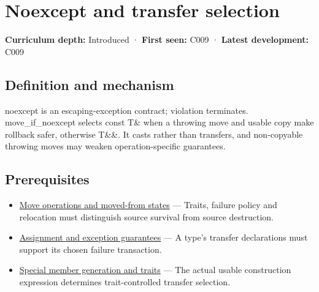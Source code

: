 \hypertarget{appendix-c746afaa47d1}{}\label{referencestart:appendix-c746afaa47d1}
\section{Noexcept and transfer selection}\label{appendix-c746afaa47d1-noexcept-and-transfer-selection}

\hypertarget{appendix-c746afaa47d1-noexcept-and-transfer-selection}{}

\textbf{Curriculum depth:} Introduced · \textbf{First seen:} C009 · \textbf{Latest development:} C009

\begin{allmightroledefinition}

\subsection{Definition and mechanism}\label{appendix-c746afaa47d1-definition-and-mechanism}

\hypertarget{appendix-c746afaa47d1-definition-and-mechanism}{}

noexcept is an escaping-exception contract; violation terminates. move\_if\_noexcept selects const T\& when a throwing move and usable copy make rollback safer, otherwise T\&\&. It casts rather than transfers, and non-copyable throwing moves may weaken operation-specific guarantees.

\end{allmightroledefinition}

\subsection{Prerequisites}\label{appendix-c746afaa47d1-prerequisites}

\hypertarget{appendix-c746afaa47d1-prerequisites}{}

\begin{itemize}
\tightlist
\item
  \hyperref[appendix-5636651017c2]{Move operations and moved-from states} --- Traits, failure policy and relocation must distinguish source survival from source destruction.
\item
  \hyperref[appendix-bea6beb5350f]{Assignment and exception guarantees} --- A type's transfer declarations must support its chosen failure transaction.
\item
  \hyperref[appendix-42e02a12c694]{Special member generation and traits} --- The actual usable construction expression determines trait-controlled transfer selection.
\end{itemize}

